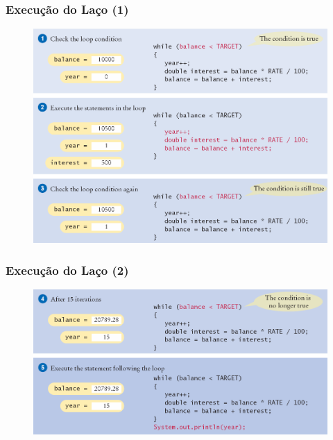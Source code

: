 \documentclass[xcolor={dvipsnames,table},aspectratio=169]{beamer}
\begin{document}
\begin{frame}\frametitle{Execução do Laço (1)}
\begin{figure}[h]
	\includegraphics[height=0.70\paperheight,center]{pucrs-ep-fprog-unidade_04-lacos-laminas-execucao_do_laco_1.png}
\end{figure}
\end{frame}

\begin{frame}\frametitle{Execução do Laço (2)}
\begin{figure}[h]
	\includegraphics[height=0.50\paperheight,center]{pucrs-ep-fprog-unidade_04-lacos-laminas-execucao_do_laco_2.png}
\end{figure}
\end{frame}
\end{document}
